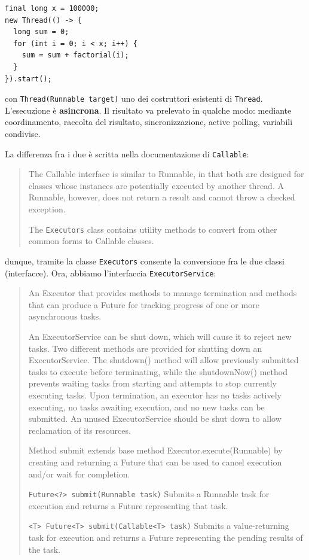 \documentclass[\fontsizeclass,twocolumn]{\classname}
\theoremstyle{definition}
\theoremstyle{definition}
\begin{document}
\begin{lstlisting}
final long x = 100000;
new Thread(() -> {
  long sum = 0;
  for (int i = 0; i < x; i++) {
    sum = sum + factorial(i);
  }
}).start();
\end{lstlisting}

con \texttt{Thread(Runnable target)} uno dei costruttori esistenti di
\texttt{Thread}. L'esecuzione è \textbf{asincrona}. Il risultato va prelevato
in qualche modo: mediante coordinamento, raccolta del risultato,
sincronizzazione, active polling, variabili condivise.

La differenza fra i due è scritta nella documentazione di \texttt{Callable}:
\begin{quote}
    \footnotesize{The Callable interface is similar to Runnable, in that both are designed for classes whose instances are potentially executed by another thread. A Runnable, however, does not return a result and cannot throw a checked exception.

        The \texttt{Executors} class contains utility methods to convert from other common forms to Callable classes.
}
\end{quote}

dunque, tramite la classe \texttt{Executors} consente la conversione fra le due
classi (interfacce). Ora, abbiamo l'interfaccia \texttt{ExecutorService}:
\begin{quote}
    \footnotesize{An Executor that provides methods to manage termination and methods that can produce a Future for tracking progress of one or more asynchronous tasks.

An ExecutorService can be shut down, which will cause it to reject new tasks. Two different methods are provided for shutting down an ExecutorService. The shutdown() method will allow previously submitted tasks to execute before terminating, while the shutdownNow() method prevents waiting tasks from starting and attempts to stop currently executing tasks. Upon termination, an executor has no tasks actively executing, no tasks awaiting execution, and no new tasks can be submitted. An unused ExecutorService should be shut down to allow reclamation of its resources.

Method submit extends base method Executor.execute(Runnable) by creating and returning a Future that can be used to cancel execution and/or wait for completion.

\texttt{Future<?> 	submit(Runnable task)} 	Submits a Runnable task for execution and returns a Future representing that task.

\texttt{<T> Future<T> 	submit(Callable<T> task)} 	Submits a value-returning task for execution and returns a Future representing the pending results of the task.
}
\end{quote}
\end{document}
